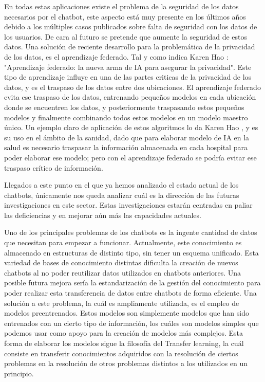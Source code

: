 En todas estas aplicaciones existe el problema de la seguridad de los datos necesarios por el chatbot, este aspecto está muy presente en los últimos años debido a los múltiples casos publicados sobre falta de seguridad con los datos de los usuarios. De cara al futuro se pretende que aumente la seguridad de estos datos. Una solución de reciente desarrollo para la problemática de la privacidad de los datos, es el aprendizaje federado. Tal y como indica Karen Hao \cite{RefWorks:RefID:42-hao1970aprendizaje}: "Aprendizaje federado: la nueva arma de IA para asegurar la privacidad". Este tipo de aprendizaje influye en una de las partes criticas de la privacidad de los datos, y es el traspaso de los datos entre dos ubicaciones. El aprendizaje federado evita ese traspaso de los datos, entrenando pequeños modelos en cada ubicación donde se encuentren los datos, y posteriormente traspasando estos pequeños modelos y finalmente combinando todos estos modelos en un modelo maestro único. Un ejemplo claro de aplicación de estos algoritmos lo da Karen Hao \cite{RefWorks:RefID:42-hao1970aprendizaje}, y es su uso en el ámbito de la sanidad, dado que para elaborar modelo de IA en la salud es necesario traspasar la información almacenada en cada hospital para poder elaborar ese modelo; pero con el aprendizaje federado se podría evitar ese traspaso crítico de información.

Llegados a este punto en el que ya hemos analizado el estado actual de los chatbots, únicamente nos queda analizar cuál es la dirección de las futuras investigaciones en este sector. Estas investigaciones estarán centradas en paliar las deficiencias y en mejorar aún más las capacidades actuales.

Uno de los principales problemas de los chatbots es la ingente cantidad de datos que necesitan para empezar a funcionar. Actualmente, este conocimiento es almacenado en estructuras de distinto tipo, sin tener un esquema unificado. Esta variedad de bases de conocimiento distintas dificulta la creación de nuevos chatbots al no poder reutilizar datos utilizados en chatbots anteriores. Una posible futura mejora sería la estandarización de la gestión del conocimiento para poder realizar esta transferencia de datos entre chatbots de forma eficiente. Una solución a este problema, la cuál es ampliamente utilizada, es el empleo de modelos preentrenados. Estos modelos son simplemente modelos que han sido entrenados con un cierto tipo de información, los cuáles son modelos simples que podemos usar como apoyo para la creación de modelos más complejos. Esta forma de elaborar los modelos sigue la filosofía del Transfer learning, la cuál consiste en transferir conocimientos adquiridos con la resolución de ciertos problemas en la resolución de otros problemas distintos a los utilizados en un principio.

